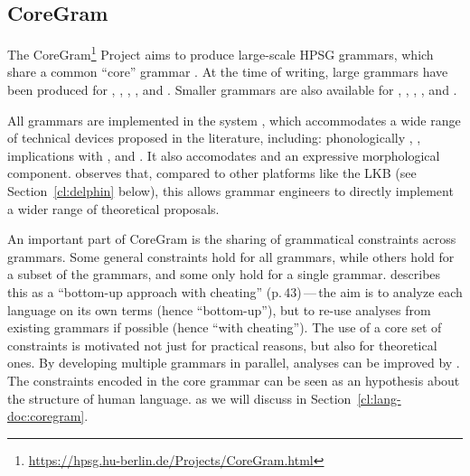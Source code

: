 \documentclass[output=paper,nonflat]{langsci/langscibook}
\begin{document}
\subsection{CoreGram}
\label{cl:coregram}


The CoreGram\footnote{
	\url{https://hpsg.hu-berlin.de/Projects/CoreGram.html}
} Project
aims to produce large-scale HPSG grammars,
which share a common ``core'' grammar \citep{MuellerCoreGram}.
At the time of writing, large grammars have been produced for
 \citep{MuellerLehrbuch1},
 \citep{MOeDanish-language},
 \citep{MG2010a},
 \citep{MuellerMalteseSketch},
and  \citep{ML2013a}.
Smaller grammars are also available for , , , , and .

All grammars are implemented
in the  system \citep{MPR2002a-u,Penn2004a-u},
which accommodates a wide range of technical devices proposed in the literature, including:
phonologically ,
,
implications with ,
and .
It also accomodates  and an expressive morphological component.
\citet{MelnikHandWritten} observes that,
compared to other platforms like the LKB (see Section~\ref{cl:delphin} below),
this allows grammar engineers to directly implement a wider range of theoretical proposals.

An important part of CoreGram is the sharing of grammatical constraints across grammars.
Some general constraints hold for all grammars,
while others hold for a subset of the grammars,
and some only hold for a single grammar.
\citet{MuellerCoreGram} describes this as a
``bottom-up approach with cheating'' (p.\,43)\,---\,the aim is
to analyze each language on its own terms (hence ``bottom-up''),
but to re-use analyses from existing grammars if possible (hence ``with cheating'').
The use of a core set of constraints is motivated not just for practical reasons,
but also for theoretical ones.
By developing multiple grammars in parallel,
analyses can be improved by .
The constraints encoded in the core grammar
can be seen as an hypothesis about the structure of human language.
as we will discuss in Section~\ref{cl:lang-doc:coregram}.
\end{document}
